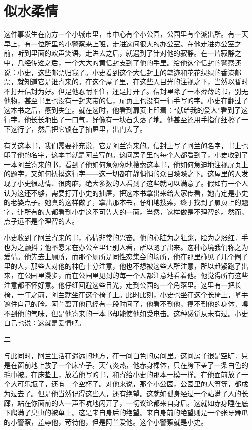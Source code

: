 \chapter{似水柔情}

这件事发生在南方一个小城市里，市中心有个小公园，公园里有个派出所。有一天早上，有一位所里的小警察来上班，走进这间很大的办公室。在他走进办公室之前，听到里面的欢声笑语，走进去之后，就遇到了针对他的寂静。在一片寂静之中，几经传递之后，一个大大的黄信封支到了他的手里。给他这个信封的警察还说：小史，这些邮票归我了。小史看到这个大信封上的笔迹和花花绿绿的香港邮票，就知道它是谁寄来的。在这个屋子里，在这些人目光的注视之下，当然以暂时不打开信封为好。但是他忍耐不住，还是打开了。信封里除了一本薄薄的书，别无他物，甚至书里也没有一封夹带的信，扉页上也没有一行手写的字。小史在翻过了这本书之后，感到失望。就在这时，他看到扉页上印着：“献给我的爱人”看到了这行字，他长长地出了一口气，好像有一块石头落了地。他甚至还用手指仔细擦了一下这行字，然后把它锁在了抽屉里，出门去了。 

有关这本书，我们需要补充说，它是阿兰寄来的。信封上写了阿兰的名字，书上也印了他的名字，这本书就是阿兰写的。这间房子里的每个人都看到了，小史收到了一本阿兰寄来的书，看到了他如何急匆匆地搜索这本书，他如何急迫地注视扉页上的题字，又如何抚摸这行字——这一切都在静悄悄的众目睽睽之下。这屋里的人发现了小史很动情、很肉麻，绝大多数的人看到了这些就可以满意了。假如有一个人认为这还不够，需要打开小史的抽屉，把这本书拿出来给大家传看，她肯定是小史的老婆点子。她真的这样做了，拿出那本书，仔细地搜索，终于找到了扉页上的题字，让所有的人都看到小史这不可告人的一面。当然，这样做是不理智的。然而，点子远不是个理智的人。 

小史收到了阿兰寄来的书，心情非常的兴奋。他的心脏为之狂跳，脸为之涨红，手也为之颤抖；他不愿呆在办公室里让别人看，所以跑了出来。这种心境我们称之为爱情。他先去上厕所，而那个厕所是同性恋集会的场所，他在那里碰见了几个圈子里的人，那些人对他的神色十分注意，他也不想被这些人所注意，所以赶紧跑了出来，在公园里漫步，而在公园里见到的每一个人都注意地看着他。他觉得所有这些注意都不怀好意。他仔细回避这些目光，走到公园的一个角落里。这里有一把长椅，一年之前，阿兰就坐在这个椅子上。此时此刻，小史也坐在这个长椅上，拿手遮住自己的脸。阿兰离开他已经有一段时间了，他看不到他，摸不到他的身体，嗅不到他的气味，但是他寄来的一本书却能使他如受电击。这种感觉从未有过。小史自己也说：这就是爱情吧。 

二 

与此同时，阿兰生活在遥远的地方，在一间白色的房间里。这间房子很是空旷，只是在窗前地上放了一个床垫子。天气炎热，他赤身棵体，只在胯下盖了一条白色的毛巾被。在床垫上，放着他写的书，和寄给小史的那本一模一样。在他面前放了一个大可乐瓶子，还有一个空杯子。对他来说，那个小公园，公园里的人等等，都成为过去了。但是他当然记得这些人，还有绝望。这就如孤身经过一个站满了人的长廊，站在你面前的人一声不吭地闪开了，一切议论都来自身后。这就如赤身睡在底下爬满了臭虫的被单上。这是来自身后的绝望。来自身前的绝望则是一个张牙舞爪的小警察，羞辱他，苛待他，但是阿兰爱他。这个小警察就是小史。 

